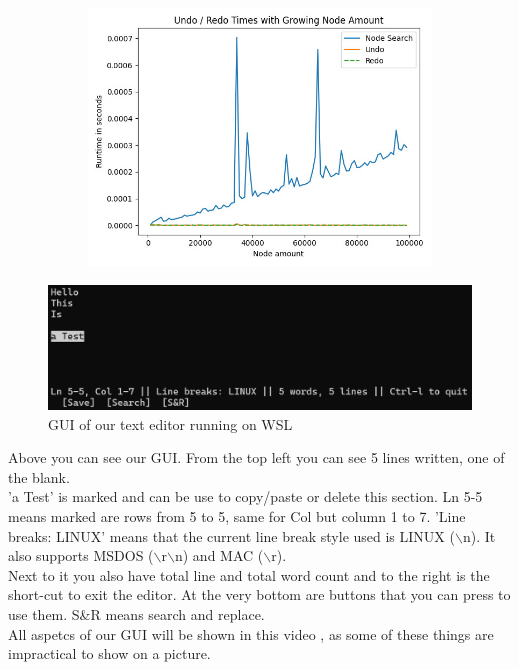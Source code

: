 \begin{figure}[H]
\begin{subfigure}[b]{0.3\textwidth}
    \label{fig:findMetric}
\end{subfigure}
\hfill
\begin{subfigure}[b]{0.3\textwidth}
    \centering
    \includegraphics[width=\textwidth]{./images/Profiler-Undo-Redo.jpg}
    \label{fig:undoMetric}
\end{subfigure}
\label{fig:codeStructure}
\end{figure}

\begin{figure}[h]
    \centering
    \includegraphics[width=1.0\linewidth]{figures/results_terminal.png}
    \caption{GUI of our text editor running on WSL}
    \label{fig:GUIterminal}            
\end{figure}
\noindent
Above you can see our GUI. From the top left you can see 5 lines written, one of the blank.
\\'a Test' is marked and can be use to copy/paste or delete this section.
Ln 5-5 means marked are rows from 5 to 5, same for Col but column 1 to 7.
'Line breaks: LINUX' means that the current line break style used is LINUX ($\backslash$n). It also supports MSDOS ($\backslash$r$\backslash$n) and MAC ($\backslash$r).
\\Next to it you also have total line and total word count and to the right is the short-cut to exit the editor.
At the very bottom are buttons that you can press to use them. S\&R means search and replace.
\\All aspetcs of our GUI will be shown in this video \cite{demo}, as some of these things are impractical to show on a picture.